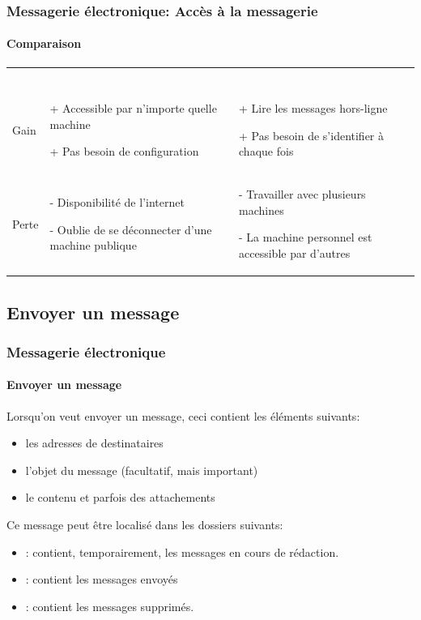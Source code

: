 \documentclass[xcolor=table]{beamer}
\begin{document}
\begin{frame}
\frametitle{Messagerie électronique: Accès à la messagerie}
\framesubtitle{Comparaison}

\begin{tabular}{p{}p{}p{}}
	\rowcolor{darkblue}
	& \textcolor{white}{Navigateur web} & \textcolor{white}{Client de messagerie} \\
	
	Gain &
	+ Accessible par n'importe quelle machine
	
	+ Pas besoin de configuration
	
	& 
	+ Lire les messages hors-ligne
	
	+ Pas besoin de s'identifier à chaque fois
	\\
	
	Perte &
	- Disponibilité de l'internet
	
	- Oublie de se déconnecter d'une machine publique
	&
	- Travailler avec plusieurs machines
	
	- La machine personnel est accessible par d'autres
	\\
\end{tabular}

\end{frame}

\subsection{Envoyer un message}

\begin{frame}
\frametitle{Messagerie électronique}
\framesubtitle{Envoyer un message}

Lorsqu'on veut envoyer un message, ceci contient les éléments suivants: 
\begin{itemize}
	\item les adresses de destinataires 
	\item l'objet du message (facultatif, mais important)
	\item le contenu et parfois des attachements
\end{itemize}

Ce message peut être localisé dans les dossiers suivants:
\begin{itemize}
	\item {}: contient, temporairement, les messages en cours de rédaction.
	\item {}: contient les messages envoyés
	\item {}: contient les messages supprimés.
\end{itemize}

\end{frame}
\end{document}
